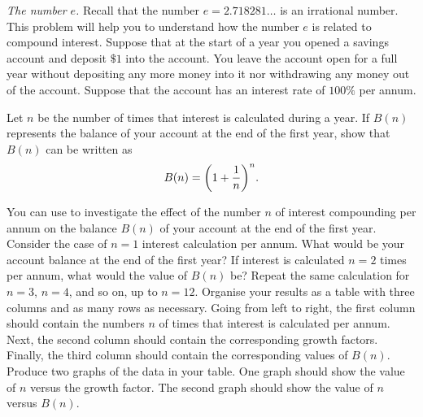 \documentclass[a4paper,oneside,12pt]{article}
\begin{document}
\begin{problem}
\item\label{prob:exponential:number_e}
  \emph{The number $e$.}
  Recall that the number $e = 2.718281\dots$ is an irrational number.
  This problem will help you to understand how the number $e$ is
  related to compound interest.  Suppose that at the start of a year
  you opened a savings account and deposit $\$1$ into the account.
  You leave the account open for a full year without depositing any
  more money into it nor withdrawing any money out of the account.
  Suppose that the account has an interest rate of $100\%$ per annum.
  \begin{packedenum}
  \item\label{subprob:e_balance_formula}
    Let $n$ be the number of times that interest is calculated during
    a year.  If $B(n)$ represents the balance of your account at the
    end of the first year, show that $B(n)$ can be written as
    \begin{equation}
    \label{eqn:e_savings_first_year_n_compounding}
    B(n)
    =
    \parenthesis*{
      1 + \frac{1}{n}
    }^n.
    \end{equation}

  \item\label{subprob:e_balance_up_to_12_compounding}
    You can use  to
    investigate the effect of the number $n$ of interest compounding
    per annum on the balance $B(n)$ of your account at the end of the
    first year.  Consider the case of $n = 1$ interest calculation per
    annum.  What would be your account balance at the end of the first
    year?  If interest is calculated $n = 2$ times per annum, what
    would the value of $B(n)$ be?  Repeat the same calculation for
    $n = 3$, $n = 4$, and so on, up to $n = 12$.  Organise your
    results as a table with three columns and as many rows as
    necessary.  Going from left to right, the first column should
    contain the numbers $n$ of times that interest is calculated per
    annum.  Next, the second column should contain the corresponding
    growth factors.  Finally, the third column should contain the
    corresponding values of $B(n)$.  Produce two graphs of the data in
    your table.  One graph should show the value of $n$ versus the
    growth factor.  The second graph should show the value of $n$
    versus $B(n)$.


\end{packedenum}
\end{problem}
\end{document}
